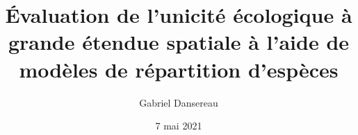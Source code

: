 \documentclass[12pt,twoside,maitrise]{x_template}
\begin{document}



\title{Évaluation de l'unicité écologique à grande étendue spatiale à l'aide de 
       modèles de répartition d'espèces}

\author{Gabriel Dansereau}



\date{7 mai 2021} %










\end{document}
